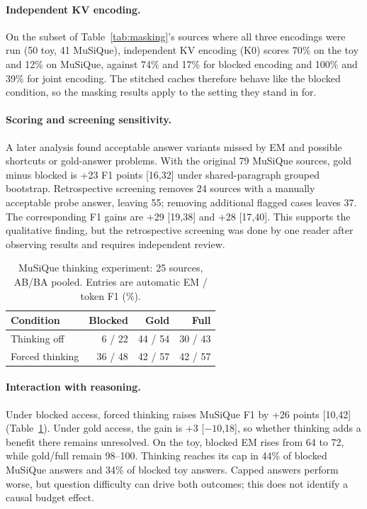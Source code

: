 \documentclass[sigconf,nonacm]{acmart}
\begin{document}
\paragraph{Independent KV encoding.}
On the subset of Table~\ref{tab:masking}'s sources where all three encodings
were run (50 toy, 41 MuSiQue), independent KV encoding (K0) scores 70\% on the
toy and 12\% on MuSiQue, against 74\% and 17\% for blocked encoding and 100\%
and 39\% for joint encoding. The stitched caches therefore behave like the
blocked condition, so the masking results apply to the setting they stand in for.

\paragraph{Scoring and screening sensitivity.}
A later analysis found acceptable answer variants missed by EM and possible
shortcuts or gold-answer problems. With the original 79 MuSiQue sources,
gold minus blocked is +23 F1 points [16,32] under shared-paragraph grouped
bootstrap. Retrospective screening removes 24 sources with a manually
acceptable probe answer, leaving 55; removing additional flagged cases
leaves 37. The corresponding F1 gains are +29 [19,38] and +28 [17,40].
This supports the qualitative finding, but the retrospective screening was
done by one reader after observing results and requires independent review.

\begin{table}[t]
\centering
\caption{MuSiQue thinking experiment: 25 sources, AB/BA pooled.
Entries are automatic EM / token F1 (\%).}
\label{tab:thinking}
\begin{tabular}{lrrr}
\toprule
Condition & Blocked & Gold & Full \\
\midrule
Thinking off & 6 / 22 & 44 / 54 & 30 / 43 \\
Forced thinking & 36 / 48 & 42 / 57 & 42 / 57 \\
\bottomrule
\end{tabular}
\end{table}

\paragraph{Interaction with reasoning.}
Under blocked access, forced thinking raises MuSiQue F1 by +26 points
[10,42] (Table~\ref{tab:thinking}). Under gold access, the gain is +3
[$-10$,18], so whether thinking adds a benefit there remains unresolved.
On the toy, blocked EM rises from 64 to 72, while gold/full remain 98--100.
Thinking reaches its cap in 44\% of blocked MuSiQue answers and 34\% of
blocked toy answers. Capped answers perform worse, but question difficulty
can drive both outcomes; this does not identify a causal budget effect.
\end{document}
